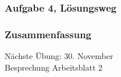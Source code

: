\documentclass[9pt,german]{beamer}%
\begin{document}
\begin{frame}[t]%
  \frametitle{Aufgabe 4, L\"osungsweg}%
\medskip


\end{frame}


\def\kap{7}%



\begin{frame}
  \frametitle{Zusammenfassung}%
\tableofcontents[current]
\end{frame}

\begin{frame}
\centering
\Huge{}
\vspace{2cm}

{\LARGE
N\"achste \"Ubung: 30. November\\
Besprechung Arbeitsblatt 2
}
\end{frame}


\end{document}

